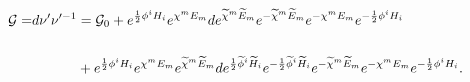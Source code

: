 \begin{equation}
\begin{aligned}
\mathcal{G=}d\nu ^{\prime }\nu ^{\prime -1}&=\mathcal{G}_{0}+e^{%
\frac{1}{2}\phi ^{i}H_{i}}e^{\chi ^{m}E_{m}}de^{%
\widetilde{\chi }^{m}\widetilde{E}_{m}}e^{-\widetilde{\chi }^{m}%
\widetilde{E}_{m}}e^{-\chi ^{m}E_{m}}e^{-\frac{1}{2}\phi
^{i}H_{i}}\\
\\
&+e^{\frac{1}{2}\phi ^{i}H_{i}}%
e^{\chi ^{m}E_{m}}e^{\widetilde{\chi }^{m}\widetilde{E}%
_{m}}de^{\frac{1}{2}\widetilde{\phi }^{i}\widetilde{H}_{i}}%
e^{-\frac{1}{2}\widetilde{\phi }^{i}\widetilde{H}_{i}}e^{-%
\widetilde{\chi }^{m}\widetilde{E}_{m}}e^{-\chi ^{m}E_{m}}e%
^{-\frac{1}{2}\phi ^{i}H_{i}}.
\end{aligned}
\end{equation}

